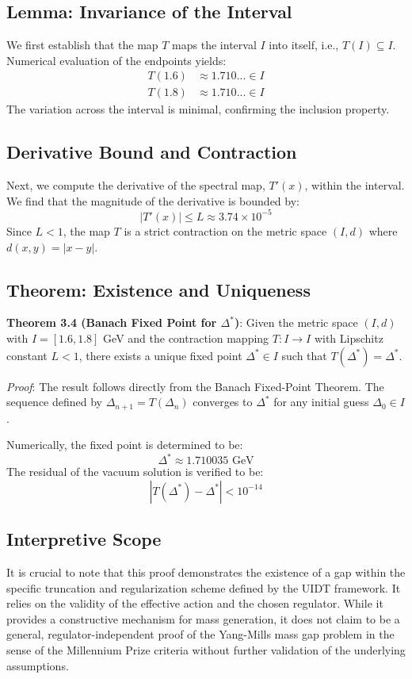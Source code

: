 \documentclass[aps,prd,twocolumn,superscriptaddress,nofootinbib,10pt]{revtex4-2}
\begin{document}
\subsection{Lemma: Invariance of the Interval}
We first establish that the map $T$ maps the interval $I$ into itself, i.e., $T(I) \subseteq I$. Numerical evaluation of the endpoints yields:
\begin{align}
T(1.6) &\approx 1.710... \in I \\
T(1.8) &\approx 1.710... \in I
\end{align}
The variation across the interval is minimal, confirming the inclusion property.

\subsection{Derivative Bound and Contraction}
Next, we compute the derivative of the spectral map, $T'(x)$, within the interval. We find that the magnitude of the derivative is bounded by:
\begin{equation}
|T'(x)| \leq L \approx 3.74 \times 10^{-5}
\end{equation}
Since $L < 1$, the map $T$ is a strict contraction on the metric space $(I, d)$ where $d(x,y) = |x-y|$.

\subsection{Theorem: Existence and Uniqueness}
\textbf{Theorem 3.4 (Banach Fixed Point for $\Delta^*$)}:
Given the metric space $(I, d)$ with $I=[1.6, 1.8]$ GeV and the contraction mapping $T: I \to I$ with Lipschitz constant $L < 1$, there exists a unique fixed point $\Delta^* \in I$ such that $T(\Delta^*) = \Delta^*$.

\textit{Proof}: The result follows directly from the Banach Fixed-Point Theorem. The sequence defined by $\Delta_{n+1} = T(\Delta_n)$ converges to $\Delta^*$ for any initial guess $\Delta_0 \in I$.

Numerically, the fixed point is determined to be:
\begin{equation}
\Delta^* \approx 1.710035 \text{ GeV}
\end{equation}
The residual of the vacuum solution is verified to be:
\begin{equation}
|T(\Delta^*) - \Delta^*| < 10^{-14}
\end{equation}

\subsection{Interpretive Scope}
It is crucial to note that this proof demonstrates the existence of a gap within the specific truncation and regularization scheme defined by the UIDT framework. It relies on the validity of the effective action and the chosen regulator. While it provides a constructive mechanism for mass generation, it does not claim to be a general, regulator-independent proof of the Yang-Mills mass gap problem in the sense of the Millennium Prize criteria without further validation of the underlying assumptions.
\end{document}
